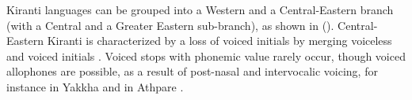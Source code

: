 Kiranti languages can be grouped into a Western and a Central-Eastern branch (with a Central and a Greater Eastern sub-branch), as shown in  (\citealt{Bickeletal_Firstperson}). Central-Eastern Kiranti is characterized by a loss of voiced initials by merging voiceless and voiced initials \citep{Michailovsky1994Manner}. Voiced stops with phonemic value rarely occur, though voiced allophones are possible, as a result of post-nasal and intervocalic voicing, for instance in Yakkha and in Athpare \citep[505]{Ebert2003Kiranti}. 


